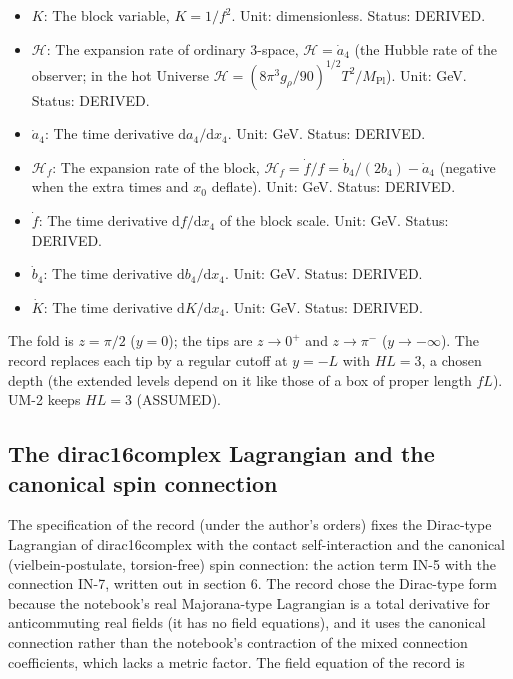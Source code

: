 \documentclass[
  10pt,
]{article}
\begin{document}
\begin{itemize}
\item
  \(K\): The block variable, \(K = 1/f^2\). Unit: dimensionless. Status:
  DERIVED.
\item
  \(\mathcal{H}\): The expansion rate of ordinary 3-space,
  \(\mathcal{H} = \dot a_4\) (the Hubble rate of the observer; in the
  hot Universe
  \(\mathcal{H} = (8\pi^3g_\rho/90)^{1/2}T^2/M_{\mathrm{Pl}}\)). Unit:
  GeV. Status: DERIVED.
\item
  \(\dot a_4\): The time derivative \(\mathrm{d}a_4/\mathrm{d}x_4\).
  Unit: GeV. Status: DERIVED.
\item
  \(\mathcal{H}_f\): The expansion rate of the block,
  \(\mathcal{H}_f = \dot f/f = \dot b_4/(2b_4) - \dot a_4\) (negative
  when the extra times and \(x_0\) deflate). Unit: GeV. Status: DERIVED.
\item
  \(\dot f\): The time derivative \(\mathrm{d}f/\mathrm{d}x_4\) of the
  block scale. Unit: GeV. Status: DERIVED.
\item
  \(\dot b_4\): The time derivative \(\mathrm{d}b_4/\mathrm{d}x_4\).
  Unit: GeV. Status: DERIVED.
\item
  \(\dot K\): The time derivative \(\mathrm{d}K/\mathrm{d}x_4\). Unit:
  GeV. Status: DERIVED.
\end{itemize}

The fold is \(z = \pi/2\) (\(y = 0\)); the tips are \(z \to 0^+\) and
\(z \to \pi^-\) (\(y \to -\infty\)). The record replaces each tip by a
regular cutoff at \(y = -L\) with \(HL = 3\), a chosen depth (the
extended levels depend on it like those of a box of proper length
\(fL\)). UM-2 keeps \(HL = 3\) (ASSUMED).

\hypertarget{the-dirac16complex-lagrangian-and-the-canonical-spin-connection}{%
\subsection{The dirac16complex Lagrangian and the canonical spin
connection}\label{the-dirac16complex-lagrangian-and-the-canonical-spin-connection}}

The specification of the record (under the author's orders) fixes the
Dirac-type Lagrangian of dirac16complex with the contact
self-interaction and the canonical (vielbein-postulate, torsion-free)
spin connection: the action term IN-5 with the connection IN-7, written
out in section 6. The record chose the Dirac-type form because the
notebook's real Majorana-type Lagrangian is a total derivative for
anticommuting real fields (it has no field equations), and it uses the
canonical connection rather than the notebook's contraction of the mixed
connection coefficients, which lacks a metric factor. The field equation
of the record is
\end{document}
